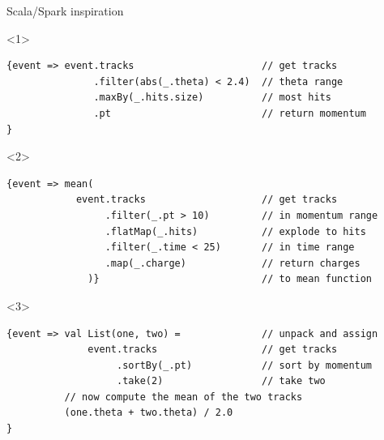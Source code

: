 \documentclass{beamer}
\begin{document}
\begin{frame}[fragile]{Scala/Spark inspiration}
\vspace{-0.2 cm}
\scriptsize
\begin{onlyenv}<1>
\begin{verbatim}
{event => event.tracks                      // get tracks
               .filter(abs(_.theta) < 2.4)  // theta range
               .maxBy(_.hits.size)          // most hits
               .pt                          // return momentum
}
\end{verbatim}
\end{onlyenv}
\begin{onlyenv}<2>
\begin{verbatim}
{event => mean(
            event.tracks                    // get tracks
                 .filter(_.pt > 10)         // in momentum range
                 .flatMap(_.hits)           // explode to hits
                 .filter(_.time < 25)       // in time range
                 .map(_.charge)             // return charges
              )}                            // to mean function
\end{verbatim}
\end{onlyenv}
\begin{onlyenv}<3>
\begin{verbatim}
{event => val List(one, two) =              // unpack and assign
              event.tracks                  // get tracks
                   .sortBy(_.pt)            // sort by momentum
                   .take(2)                 // take two
          // now compute the mean of the two tracks
          (one.theta + two.theta) / 2.0
}
\end{verbatim}
\end{onlyenv}
\end{frame}
\end{document}
